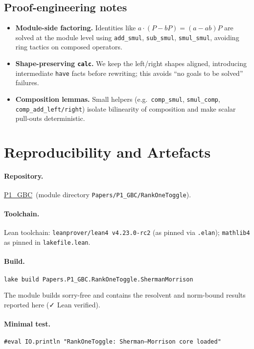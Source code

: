 \documentclass[11pt]{article}
\theoremstyle{definition}
\newcommand{\leanRepoTag}{\href{https://github.com/AICardiologist/FoundationRelativity/tree/main/Papers/P1_GBC}{P1\_GBC}}
\newcommand{\leanok}{\textsf{\small \textcolor{green!60!black}{✓ Lean verified}}}
\begin{document}
\subsection*{Proof-engineering notes}
\begin{itemize}
\item \textbf{Module-side factoring.} Identities like $a\cdot(P-bP)=(a-ab)P$ are solved at the module level using \texttt{add\_smul}, \texttt{sub\_smul}, \texttt{smul\_smul}, avoiding ring tactics on composed operators.
\item \textbf{Shape-preserving \texttt{calc}.} We keep the left/right shapes aligned, introducing intermediate \texttt{have} facts before rewriting; this avoids ``no goals to be solved'' failures.
\item \textbf{Composition lemmas.} Small helpers (e.g.\ \texttt{comp\_smul}, \texttt{smul\_comp}, \texttt{comp\_add\_{left/right}}) isolate bilinearity of composition and make scalar pull-outs deterministic.
\end{itemize}

\section{Reproducibility and Artefacts}\label{sec:artefacts}

\paragraph{Repository.} \leanRepoTag\ (module directory \texttt{Papers/P1\_GBC/RankOneToggle}).

\paragraph{Toolchain.} Lean toolchain: \texttt{leanprover/lean4 v4.23.0-rc2} (as pinned via \texttt{.elan}); \texttt{mathlib4} as pinned in \texttt{lakefile.lean}.

\paragraph{Build.}
\begin{verbatim}
lake build Papers.P1_GBC.RankOneToggle.ShermanMorrison
\end{verbatim}
The module builds sorry-free and contains the resolvent and norm-bound results reported here (\leanok).

\paragraph{Minimal test.}
\begin{verbatim}
#eval IO.println "RankOneToggle: Sherman–Morrison core loaded"
\end{verbatim}
\end{document}

